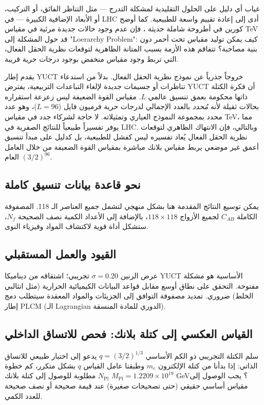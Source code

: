 \documentclass[11pt,a4paper]{article}
\newcommand{\Mpl}{M_{\mathrm{Pl}}}
\begin{document}
	غياب أي دليل على الحلول التقليدية لمشكلة التدرج — مثل التناظر الفائق، أو التركيب، أو الأبعاد الإضافية الكبيرة — في LHC أدى إلى إعادة تقييم واسعة للطبيعية. كما أوضح كورين في أطروحة شاملة حديثة \cite{Koren2020}، فإن عدم وجود حالات جديدة مرئية في مقياس TeV قد حول المشكلة إلى "Loerarchy Problem": كيف يمكن توليد مقياس تحت أحمر دون بنية مصاحبة؟ تتفاقم هذه الأزمة بسبب المتانة الظاهرية لتوقعات نظرية الحقل الفعال، التي تربط وجود مقياس منخفض بوجود درجات حرية قريبة.
	
	يقدم إطار YUCT خروجاً جذرياً عن نموذج نظرية الحقل الفعال. بدلاً من استدعاء تناظرات أو جسيمات جديدة لإلغاء التباعدات التربيعية، يفترض YUCT أن فكرة الكتلة ذاتها محكومة بعمق تنسيق عالمي \(L\). مقياس القوة الضعيفة ليس زعزعة استقراره بحالات ثقيلة لأنه \emph{مُحدد} بالعدد الإجمالي لدرجات حرية فرميون فايل (\(L=96\))، وهو عدد محدد بمجموعة النموذج العياري وتمثيلاته. لا حاجة لشركاء جدد في مقياس TeV، مما يوفر تفسيراً طبيعياً للنتائج الصفرية في LHC. وبالتالي، فإن الانتهاك الظاهري لتوقعات نظرية الحقل الفعال يُعاد تفسيره ليس كفشل للطبيعية، بل كدليل على مبدأ تنسيق أعمق غير موضعي يربط مقياس بلانك مباشرة بمقياس القوة الضعيفة من خلال العامل العام \((3/2)^{96}\).
	
	\subsection{نحو قاعدة بيانات تنسيق كاملة}
	
	يمكن توسيع النتائج المقدمة هنا بشكل منهجي لتشمل جميع العناصر الـ 118. المصفوفة الكاملة \(C_{AB}\) لجميع الأزواج \(118\times 118\)، بالإضافة إلى الأعداد الكمية نصف الصحيحة \(N_f\)، ستشكل أداة قوية لاكتشاف المواد وفيزياء النوى.
	
	\subsection{القيود والعمل المستقبلي}
	
	عرض الرنين \(\sigma = 0.20\) تجريبي؛ اشتقاقه من ديناميكا YUCT الأساسية هو مشكلة مفتوحة. التحقق على نطاق أوسع مقابل قواعد البيانات الكيميائية الحرارية (مثل انثالبي الخلط) ضروري. تمديد مصفوفة التوافق إلى الجزيئات والمواد المعقدة سيتطلب دمج إطار PLCM (الـ Lagrangian الدوري للمادة المنسقة).
	
	\subsection{القياس العكسي إلى كتلة بلانك: فحص للاتساق الداخلي}
	\label{subsec:reverse}
	
	سلم الكتلة التجريبي ذو الكم الأساسي $q = (3/2)^{1/3}$ يدعو إلى اختبار طبيعي للاتساق الذاتي: إذا بدأنا من كتلة الإلكترون $m_e$ وطبقنا عامل القياس $q$ بشكل متكرر، كم خطوة $N_{\mathrm{Pl}}$ مطلوبة للوصول إلى كتلة بلانك $\Mpl = 1.2209\times10^{19}$ GeV؟ يجب الوصول إلى مقياس أساسي حقيقي (حتى تصحيحات صغيرة) عند قيمة صحيحة أو نصف صحيحة للعدد الكمي.
	
\end{document}
